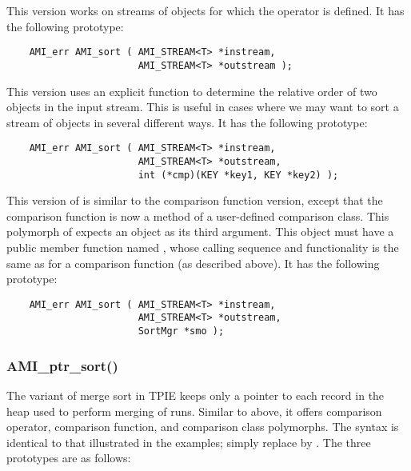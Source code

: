  This version works on streams of
objects for which the operator \myverb{<} is defined. It has
the following prototype:

\begin{verbatim}
    AMI_err AMI_sort ( AMI_STREAM<T> *instream, 
                       AMI_STREAM<T> *outstream );
\end{verbatim}

This version uses an explicit function to determine the
relative order of two objects in the input stream.  This is
useful in cases where we may want to sort a stream of
objects in several different ways.  It has the following
prototype:

\begin{verbatim}
    AMI_err AMI_sort ( AMI_STREAM<T> *instream, 
                       AMI_STREAM<T> *outstream, 
                       int (*cmp)(KEY *key1, KEY *key2) );
\end{verbatim}


This version of  is similar to the
comparison function version, except that the comparison
function is now a method of a user-defined comparison class. This polymorph of  expects an object
as its third argument. This object must have a public member
function named , whose calling sequence and
functionality is the same as for a comparison function (as
described above). It has the following
prototype:

\begin{verbatim}
    AMI_err AMI_sort ( AMI_STREAM<T> *instream, 
                       AMI_STREAM<T> *outstream, 
                       SortMgr *smo );
\end{verbatim}

\subsubsection{AMI\_ptr\_sort()}

The  variant of merge sort in TPIE
keeps only a pointer to each record in the heap used to
perform merging of runs. Similar to 
above, it offers comparison
operator, comparison function, and comparison class
polymorphs. The syntax is identical to that illustrated in
the  examples; simply replace
 by . The three
prototypes are as follows:

